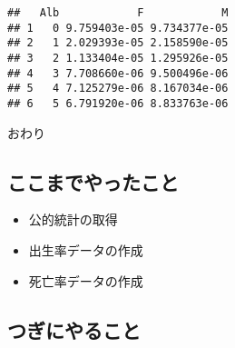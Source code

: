 \documentclass[
]{book}
\newenvironment{Shaded}{\begin{snugshade}}{\end{snugshade}}
\newcommand{\DataTypeTok}[1]{\textcolor[rgb]{0.13,0.29,0.53}{#1}}
\newcommand{\DecValTok}[1]{\textcolor[rgb]{0.00,0.00,0.81}{#1}}
\newcommand{\KeywordTok}[1]{\textcolor[rgb]{0.13,0.29,0.53}{\textbf{#1}}}
\newcommand{\NormalTok}[1]{#1}
\newcommand{\OperatorTok}[1]{\textcolor[rgb]{0.81,0.36,0.00}{\textbf{#1}}}
\newcommand{\StringTok}[1]{\textcolor[rgb]{0.31,0.60,0.02}{#1}}
\providecommand{\tightlist}{%
  \setlength{\itemsep}{0pt}\setlength{\parskip}{0pt}}
\begin{document}
\begin{Shaded}
\end{Shaded}

\begin{verbatim}
##   Alb            F            M
## 1   0 9.759403e-05 9.734377e-05
## 2   1 2.029393e-05 2.158590e-05
## 3   2 1.133404e-05 1.295926e-05
## 4   3 7.708660e-06 9.500496e-06
## 5   4 7.125279e-06 8.167034e-06
## 6   5 6.791920e-06 8.833763e-06
\end{verbatim}

おわり

\hypertarget{ux3053ux3053ux307eux3067ux3084ux3063ux305fux3053ux3068}{%
\subsection{ここまでやったこと}\label{ux3053ux3053ux307eux3067ux3084ux3063ux305fux3053ux3068}}

\begin{itemize}
\tightlist
\item
  公的統計の取得
\item
  出生率データの作成
\item
  死亡率データの作成
\end{itemize}

\hypertarget{ux3064ux304eux306bux3084ux308bux3053ux3068}{%
\subsection{つぎにやること}\label{ux3064ux304eux306bux3084ux308bux3053ux3068}}
\end{document}
